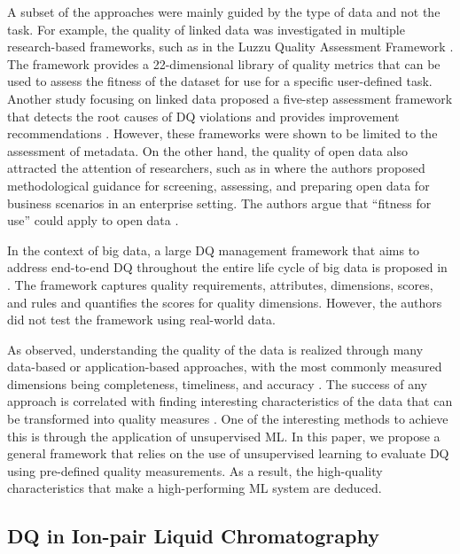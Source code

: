 A subset of the approaches were mainly guided by the type of data and not the task. For example, the quality of linked data was investigated in multiple research-based frameworks, such as in the Luzzu Quality Assessment Framework \cite{Luzzu2016}. The framework provides a 22-dimensional library of quality metrics that can be used to assess the fitness of the dataset for use for a specific user-defined task. Another study focusing on linked data proposed a five-step assessment framework that detects the root causes of DQ violations and provides improvement recommendations \cite{Nayak2021}. However, these frameworks were shown to be limited to the assessment of metadata. On the other hand, the quality of open data also attracted the attention of researchers, such as in \cite{Krasikov2023} where the authors proposed methodological guidance for screening, assessing, and preparing open data for business scenarios in an enterprise setting. The authors argue that “fitness for use” could apply to open data \cite{Krasikov2023}.

In the context of big data, a large DQ management framework that aims to address end-to-end DQ throughout the entire life cycle of big data is proposed in \cite{taleb2021}. The framework captures quality requirements, attributes, dimensions, scores, and rules and quantifies the scores for quality dimensions. However, the authors did not test the framework using real-world data. 

As observed, understanding the quality of the data is realized through many data-based or application-based approaches, with the most commonly measured dimensions being completeness, timeliness, and accuracy \cite{Cichy2019}. The success of any approach is correlated with finding interesting characteristics of the data that can be transformed into quality measures \cite{Patel2023}. One of the interesting methods to achieve this is through the application of unsupervised ML. In this paper, we propose a general framework that relies on the use of unsupervised learning to evaluate DQ using pre-defined quality measurements. As a result, the high-quality characteristics that make a high-performing ML system are deduced.

\subsection{DQ in Ion-pair Liquid Chromatography}

